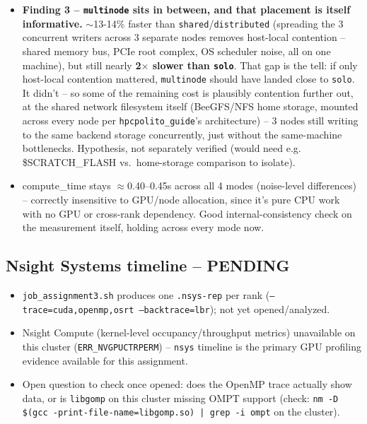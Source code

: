 \begin{itemize}
\item \textbf{Finding 3 -- \texttt{multinode} sits in between, and that placement is itself informative.} $\sim$13-14\% faster than \texttt{shared}/\texttt{distributed} (spreading the 3 concurrent writers across 3 separate nodes removes host-local contention -- shared memory bus, PCIe root complex, OS scheduler noise, all on one machine), but still nearly \textbf{2$\times$ slower than \texttt{solo}}. That gap is the tell: if only host-local contention mattered, \texttt{multinode} should have landed close to \texttt{solo}. It didn't -- so some of the remaining cost is plausibly contention further out, at the shared network filesystem itself (BeeGFS/NFS home storage, mounted across every node per \texttt{hpcpolito\_guide}'s architecture) -- 3 nodes still writing to the same backend storage concurrently, just without the same-machine bottlenecks. Hypothesis, not separately verified (would need e.g. \$SCRATCH\_FLASH vs.\ home-storage comparison to isolate).
\item compute\_time stays $\approx$0.40--0.45s across all 4 modes (noise-level differences) -- correctly insensitive to GPU/node allocation, since it's pure CPU work with no GPU or cross-rank dependency. Good internal-consistency check on the measurement itself, holding across every mode now.
\end{itemize}

\subsection{Nsight Systems timeline -- PENDING}
\begin{itemize}
\item \texttt{job\_assignment3.sh} produces one \texttt{.nsys-rep} per rank (\texttt{--trace=cuda,openmp,osrt --backtrace=lbr}); not yet opened/analyzed.
\item Nsight Compute (kernel-level occupancy/throughput metrics) unavailable on this cluster (\texttt{ERR\_NVGPUCTRPERM}) -- \texttt{nsys} timeline is the primary GPU profiling evidence available for this assignment.
\item Open question to check once opened: does the OpenMP trace actually show data, or is \texttt{libgomp} on this cluster missing OMPT support (check: \texttt{nm -D \$(gcc -print-file-name=libgomp.so) | grep -i ompt} on the cluster).
\end{itemize}

